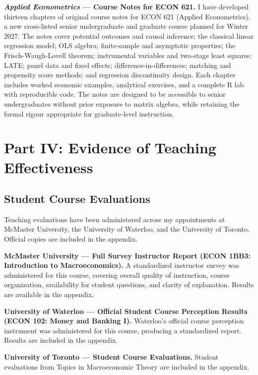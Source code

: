 \documentclass[11pt,letterpaper]{article}
\begin{document}
\textbf{\textit{Applied Econometrics} --- Course Notes for ECON 621.} I have developed thirteen chapters of original course notes for ECON 621 (Applied Econometrics), a new cross-listed senior undergraduate and graduate course planned for Winter 2027. The notes cover potential outcomes and causal inference; the classical linear regression model; OLS algebra; finite-sample and asymptotic properties; the Frisch-Waugh-Lovell theorem; instrumental variables and two-stage least squares; LATE; panel data and fixed effects; difference-in-differences; matching and propensity score methods; and regression discontinuity design. Each chapter includes worked economic examples, analytical exercises, and a complete R lab with reproducible code. The notes are designed to be accessible to senior undergraduates without prior exposure to matrix algebra, while retaining the formal rigour appropriate for graduate-level instruction.

\section{Part IV: Evidence of Teaching Effectiveness}

\subsection{Student Course Evaluations}

Teaching evaluations have been administered across my appointments at McMaster University, the University of Waterloo, and the University of Toronto. Official copies are included in the appendix.

\textbf{McMaster University --- Full Survey Instructor Report (ECON 1BB3: Introduction to Macroeconomics).} A standardized instructor survey was administered for this course, covering overall quality of instruction, course organization, availability for student questions, and clarity of explanation. Results are available in the appendix.

\textbf{University of Waterloo --- Official Student Course Perception Results (ECON 102: Money and Banking I).} Waterloo's official course perception instrument was administered for this course, producing a standardized report. Results are included in the appendix.

\textbf{University of Toronto --- Student Course Evaluations.} Student evaluations from Topics in Macroeconomic Theory are included in the appendix.
\end{document}
